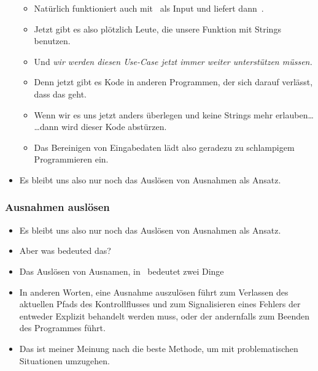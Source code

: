 \documentclass[aspectratio=169,mathserif,notheorems]{beamer}%
\begin{document}
\begin{frame}[t]
\begin{itemize}
{\begin{enumerate}
{{\begin{itemize}
\item<18-> Natürlich funktioniert  auch mit~ als Input und liefert dann~.%
\item<19-> Jetzt gibt es also plötzlich Leute, die unsere Funktion mit Strings benutzen.%
\item<20-> Und \emph{wir werden diesen Use-Case jetzt immer weiter unterstützen müssen.}%
\item<21-> Denn jetzt gibt es Kode in anderen Programmen, der sich darauf verlässt, dass das geht.%
\item<22-> Wenn wir es uns jetzt anders überlegen und keine Strings mehr erlauben{\dots} {\dots}dann wird dieser Kode abstürzen.%
\item<23-> Das Bereinigen von Eingabedaten lädt also geradezu zu schlampigem Programmieren ein.%
\end{itemize}%
}}%
\end{enumerate}}%
%
\item<24-> Es bleibt uns also nur noch das Auslösen von Ausnahmen als Ansatz.%
\end{itemize}%
\end{frame}%
%
\begin{frame}%
\frametitle{Ausnahmen auslösen}%
\begin{itemize}%
\item Es bleibt uns also nur noch das Auslösen von Ausnahmen als Ansatz.%
%
\item<2-> Aber was bedeuted das?%
%
\item<3-> Das Auslösen von Ausnamen, in~ bedeutet zwei Dinge%
%
\item<8-> In anderen Worten, eine Ausnahme auszulösen führt zum Verlassen des aktuellen Pfads des Kontrollflusses und zum Signalisieren eines Fehlers der entweder Explizit behandelt werden muss, oder der andernfalls zum Beenden des Programmes führt.%
%
\item<9-> Das ist meiner Meinung nach die beste Methode, um mit problematischen Situationen umzugehen.%
\end{itemize}%
\end{frame}%
\end{document}
